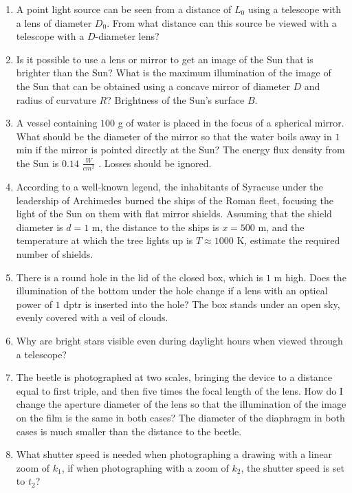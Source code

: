 \documentclass{article}
\begin{document}
\begin{enumerate}[label=13.4.\arabic*]
\item A point light source can be seen from a distance of $L_0$ using a telescope with a lens of diameter $D_0$. From what distance can this source be viewed with a telescope with a $D$-diameter lens?

\item Is it possible to use a lens or mirror to get an image of the Sun that is brighter than the Sun? What is the maximum illumination of the image of the Sun that can be obtained using a concave mirror of diameter $D$ and radius of curvature $R$? Brightness of the Sun's surface $B$.

\item A vessel containing $100$ g of water is placed in the focus of a spherical mirror. What should be the diameter of the mirror so that the water boils away in $1$ min if the mirror is pointed directly at the Sun? The energy flux density from the Sun is $0.14$ $\frac{W}{cm^2}$ . Losses should be ignored.

\item According to a well-known legend, the inhabitants of Syracuse under the leadership of Archimedes burned the ships of the Roman fleet, focusing the light of the Sun on them with flat mirror shields. Assuming that the shield diameter is $d = 1$ m, the distance to the ships is $x = 500$ m, and the temperature at which the tree lights up is $T \approx 1000$ K, estimate the required number of shields.

\item There is a round hole in the lid of the closed box, which is $1$ m high. Does the illumination of the bottom under the hole change if a lens with an optical power of $1$ dptr is inserted into the hole? The box stands under an open sky, evenly covered with a veil of clouds.

\item Why are bright stars visible even during daylight hours when viewed through a telescope?

\item The beetle is photographed at two scales, bringing the device to a distance equal to first triple, and then five times the focal length of the lens. How do I change the aperture diameter of the lens so that the illumination of the image on the film is the same in both cases? The diameter of the diaphragm in both cases is much smaller than the distance to the beetle.

\item What shutter speed is needed when photographing a drawing with a linear zoom of $k_1$, if when photographing with a zoom of $k_2$, the shutter speed is set to $t_2$?


\end{enumerate}
\end{document}
